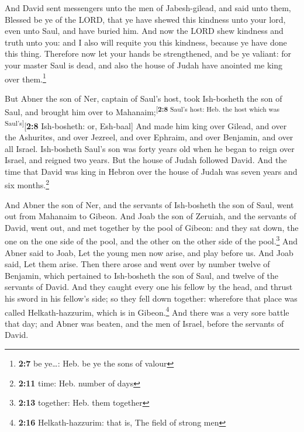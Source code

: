  And David sent messengers unto the men of Jabesh-gilead,
and said unto them, Blessed be ye of the LORD, that ye have shewed this
kindness unto your lord, even unto Saul, and have buried him.
 And now the LORD shew kindness and truth unto you: and I
also will requite you this kindness, because ye have done this thing.
 Therefore now let your hands be strengthened, and be ye
valiant: for your master Saul is dead, and also the house of Judah have
anointed me king over them.\footnote{\textbf{2:7} be ye\ldots: Heb. be
  ye the sons of valour}

 But Abner the son of Ner, captain of Saul's host, took
Ish-bosheth the son of Saul, and brought him over to
Mahanaim;\textsuperscript{{[}\textbf{2:8} Saul's host: Heb. the host
which was Saul's{]}}{[}\textbf{2:8} Ish-bosheth: or, Esh-baal{]}
 And made him king over Gilead, and over the Ashurites,
and over Jezreel, and over Ephraim, and over Benjamin, and over all
Israel.  Ish-bosheth Saul's son was forty years old when
he began to reign over Israel, and reigned two years. But the house of
Judah followed David.  And the time that David was king
in Hebron over the house of Judah was seven years and six
months.\footnote{\textbf{2:11} time: Heb. number of days}

 And Abner the son of Ner, and the servants of
Ish-bosheth the son of Saul, went out from Mahanaim to Gibeon.
 And Joab the son of Zeruiah, and the servants of David,
went out, and met together by the pool of Gibeon: and they sat down, the
one on the one side of the pool, and the other on the other side of the
pool.\footnote{\textbf{2:13} together: Heb. them together}
 And Abner said to Joab, Let the young men now arise, and
play before us. And Joab said, Let them arise.  Then
there arose and went over by number twelve of Benjamin, which pertained
to Ish-bosheth the son of Saul, and twelve of the servants of David.
 And they caught every one his fellow by the head, and
thrust his sword in his fellow's side; so they fell down together:
wherefore that place was called Helkath-hazzurim, which is in
Gibeon.\footnote{\textbf{2:16} Helkath-hazzurim: that is, The field of
  strong men}  And there was a very sore battle that day;
and Abner was beaten, and the men of Israel, before the servants of
David.

